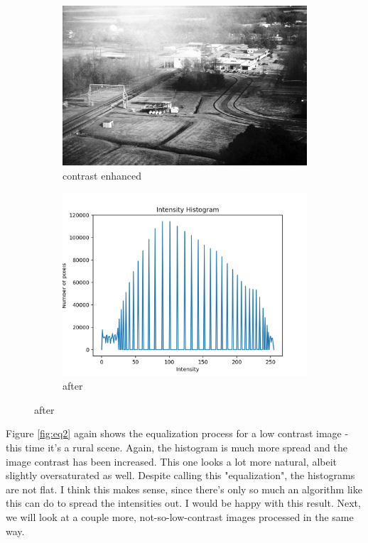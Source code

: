 \documentclass[11pt,a4paper]{article}
\begin{document}
\begin{figure}[ht]
	\ContinuedFloat
	\centering
	\begin{subfigure}[h]{0.7\textwidth}
		\includegraphics[width=\textwidth]{figs/lc2_ce}
		\caption{contrast enhanced}
		\label{fig:lc2_after}
	\end{subfigure}
	
	\begin{subfigure}[h]{0.75\textwidth}
		\includegraphics[width=\textwidth]{figs/lc2_hist_aft}
		\caption{after}
		\label{fig:hist_aft_2}
	\end{subfigure}
\end{figure}

Figure \ref{fig:eq2} again shows the equalization process for a low contrast image - this time it's a rural scene. Again, the histogram is much more spread and the image contrast has been increased. This one looks a lot more natural, albeit slightly oversaturated as well. 
Despite calling this "equalization", the histograms are not flat. I think this makes sense, since there's only so much an algorithm like this can do to spread the intensities out. I would be happy with this result. Next, we will look at a couple more, not-so-low-contrast images processed in the same way.
\end{document}
